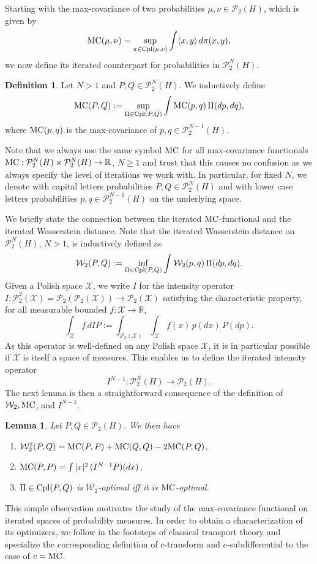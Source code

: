\documentclass[a4paper]{amsart}
\numberwithin{theorem}{section}
\newtheorem{lemma}[theorem]{Lemma}
\theoremstyle{definition}
\newtheorem{definition}[theorem]{Definition}
\newcommand{\R}{\mathbb{R}}
\newcommand{\cpl}{\textup{Cpl}}
\newcommand{\W}{\mathcal{W}}
\newcommand{\Pc}{\mathcal P}
\renewcommand{\H}{H}
\newcommand{\mc}{\textup{MC}}
\begin{document}
Starting with the max-covariance of two probabilities $\mu,\nu \in \Pc_2(\H)$, which is given by
\[
    \mc(\mu,\nu) = \sup_{\pi \in \cpl(\mu,\nu)}
    \int \langle x,y \rangle \, d\pi(x,y),
\]
we now define its iterated counterpart for probabilities in $\Pc_2^N(\H)$.

\begin{definition}\label{def:iteratedMC}
    Let $N >1$ and $P,Q \in \Pc_2^N(\H)$. We inductively define 
    \[
        \mc(P,Q) := \sup_{\Pi \in \cpl(P,Q)} \int \mc(p,q) \, \Pi(dp,dq),
    \]
    where $\mc(p,q)$ is the max-covariance of $p,q \in \Pc_2^{N-1}(\H)$.
\end{definition}
Note that we always use the same symbol $\mc$ for all max-covariance functionals $\mc : \Pc_2^N(\H) \times \Pc_2^N(\H) \to \R$, $N\geq 1$  and trust that this causes no confusion as we always specify the level of iterations we work with. In particular, for fixed $N$, we denote with capital letters probabilities $P,Q \in \Pc_2^N(\H)$ and with lower case letters probabilities $p,q \in \Pc_2^{N-1}(\H)$ on the underlying space.   

We briefly state the connection between the iterated $\mc$-functional and the iterated Wasserstein distance. Note that the iterated Wasserstein distance on $\Pc_2^N(\H)$, $N>1$, is inductively defined as 
\[
\W_2(P,Q) := \inf_{\Pi \in \cpl(P,Q)} \int \W_2(p,q) \, \Pi(dp,dq).
\]
Given a Polish space $\mathcal{X}$, we write $I$ for the intensity operator $I : \Pc^2_2(\mathcal{X}) = \Pc_2(\Pc_2(\mathcal X)) \to \Pc_2(\mathcal{X})$ satisfying the characteristic property, for all measurable bounded $f : \mathcal X \to \R$, 
\[
\int_\mathcal{X} f \, dIP  := \int_{\Pc_2(\mathcal{X})} \int_\mathcal{X} f(x) \, p(dx) \,  P(dp). 
\]
As this operator is well-defined on any Polish space $\mathcal{X}$, it is in particular possible if $\mathcal{X}$ is itself a space of measures. 
This enables us to define the iterated intensity operator
\[
    I^{N-1} : \Pc_2^N(\H) \to \Pc_2(\H).
\]
The next lemma is then a straightforward consequence of the definition of $\W_2, \mc$, and $I^{N-1}$.
\begin{lemma}\label{lem:W2_MC_connection_iterated}
Let $P,Q \in \Pc_2(\H)$. We then have  
\begin{enumerate}
    \item $\W_2^2(P,Q) = \mc(P,P)+ \mc(Q,Q) - 2\mc(P,Q)$,
    \item $\mc(P,P) = \int |x|^2 \, (I^{N-1}P)(dx)$,
    \item $\Pi \in \cpl(P,Q)$ is $\W_2$-optimal iff it is $\mc$-optimal.
\end{enumerate}
\end{lemma}
This simple observation motivates the study of the max-covariance functional on iterated spaces of probability measures.
In order to obtain a characterization of its optimizers, we follow in the footsteps of classical transport theory and specialize the corresponding definition of $c$-transform and $c$-subdifferential to the case of $c = \mc$.
\end{document}
